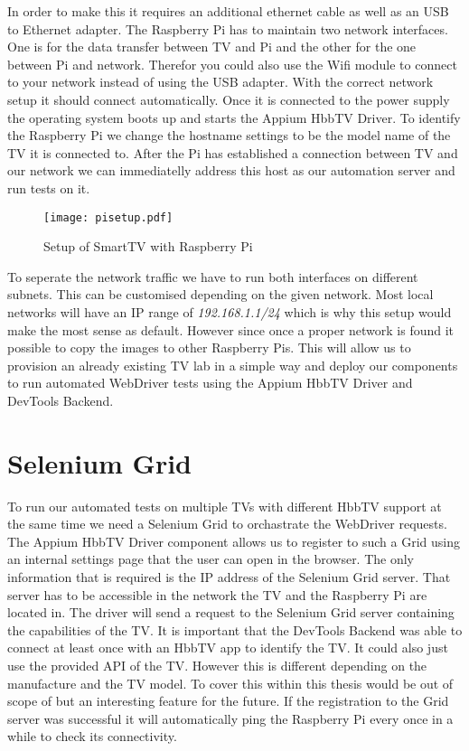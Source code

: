 In order to make this it requires an additional ethernet cable as well as an USB to Ethernet adapter.
The Raspberry Pi has to maintain two network interfaces. One is for the data transfer between TV
and Pi and the other for the one between Pi and network. Therefor you could also use the Wifi module
to connect to your network instead of using the USB adapter. With the correct network setup it should
connect automatically. Once it is connected to the power supply the operating system boots up and
starts the Appium HbbTV Driver. To identify the Raspberry Pi we change the hostname settings to be
the model name of the TV it is connected to. After the Pi has established a connection between TV
and our network we can immediatelly address this host as our automation server and run tests on it.

\vspace{1cm}
\begin{figure}[htb]
  \centering
  \texttt{[image: pisetup.pdf]}\\
  \caption{Setup of SmartTV with Raspberry Pi}\label{fig:pisetup}
\end{figure}
\vspace{0.5cm}

To seperate the network traffic we have to run both interfaces on different subnets. This can be
customised depending on the given network. Most local networks will have an IP range of
\textit{192.168.1.1/24} which is why this setup would make the most sense as default. However since
once a proper network is found it possible to copy the images to other Raspberry Pis. This will
allow us to provision an already existing TV lab in a simple way and deploy our components to run
automated WebDriver tests using the Appium HbbTV Driver and DevTools Backend.

\section{Selenium Grid\label{sec:grid}}

To run our automated tests on multiple TVs with different HbbTV support at the same time we need
a Selenium Grid to orchastrate the WebDriver requests. The Appium HbbTV Driver component allows us
to register to such a Grid using an internal settings page that the user can open in the browser.
The only information that is required is the IP address of the Selenium Grid server. That server
has to be accessible in the network the TV and the Raspberry Pi are located in. The driver will send
a request to the Selenium Grid server containing the capabilities of the TV. It is important that
the DevTools Backend was able to connect at least once with an HbbTV app to identify the TV. It
could also just use the provided API of the TV. However this is different depending on the manufacture
and the TV model. To cover this within this thesis would be out of scope of but an interesting
feature for the future. If the registration to the Grid server was successful it will automatically
ping the Raspberry Pi every once in a while to check its connectivity.

